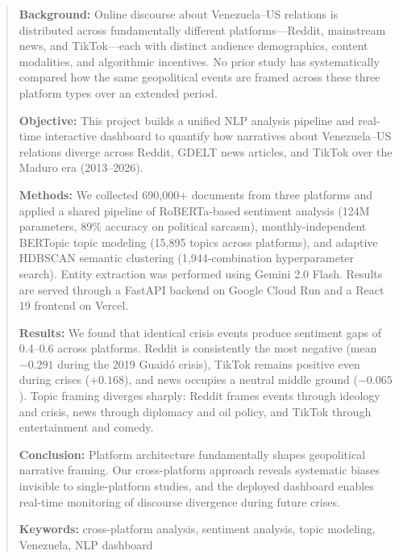 \documentclass[12pt, letterpaper]{article}
\begin{document}
\newpage
\begin{abstract}
\noindent
\textbf{Background:} Online discourse about Venezuela--US relations is distributed across fundamentally different platforms---Reddit, mainstream news, and TikTok---each with distinct audience demographics, content modalities, and algorithmic incentives. No prior study has systematically compared how the same geopolitical events are framed across these three platform types over an extended period.

\noindent
\textbf{Objective:} This project builds a unified NLP analysis pipeline and real-time interactive dashboard to quantify how narratives about Venezuela--US relations diverge across Reddit, GDELT news articles, and TikTok over the Maduro era (2013--2026).

\noindent
\textbf{Methods:} We collected 690,000+ documents from three platforms and applied a shared pipeline of RoBERTa-based sentiment analysis (124M parameters, 89\% accuracy on political sarcasm), monthly-independent BERTopic topic modeling (15,895 topics across platforms), and adaptive HDBSCAN semantic clustering (1,944-combination hyperparameter search). Entity extraction was performed using Gemini 2.0 Flash. Results are served through a FastAPI backend on Google Cloud Run and a React 19 frontend on Vercel.

\noindent
\textbf{Results:} We found that identical crisis events produce sentiment gaps of 0.4--0.6 across platforms. Reddit is consistently the most negative (mean $-0.291$ during the 2019 Guaid\'{o} crisis), TikTok remains positive even during crises ($+0.168$), and news occupies a neutral middle ground ($-0.065$). Topic framing diverges sharply: Reddit frames events through ideology and crisis, news through diplomacy and oil policy, and TikTok through entertainment and comedy.

\noindent
\textbf{Conclusion:} Platform architecture fundamentally shapes geopolitical narrative framing. Our cross-platform approach reveals systematic biases invisible to single-platform studies, and the deployed dashboard enables real-time monitoring of discourse divergence during future crises.

\vspace{0.5em}
\noindent\textbf{Keywords:} cross-platform analysis, sentiment analysis, topic modeling, Venezuela, NLP dashboard
\end{abstract}

\newpage
\tableofcontents
\listoftables
\newpage
\end{document}
